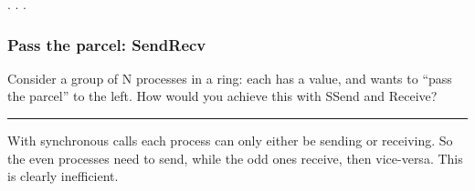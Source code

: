 . . .

\begin{Shaded}
\begin{Highlighting}[]
     
\end{Highlighting}
\end{Shaded}

\subsubsection{Pass the parcel:
SendRecv}\label{pass-the-parcel-sendrecv}

Consider a group of N processes in a ring: each has a value, and wants
to ``pass the parcel'' to the left. How would you achieve this with
SSend and Receive?

\begin{Shaded}
\begin{Highlighting}[]

     
     \NormalTok{;}

     \NormalTok{;}
     \NormalTok{;}
     \NormalTok{) \{}
      \NormalTok{;}
    \NormalTok{\}}
     \NormalTok{)\{}
      \NormalTok{;}
    \NormalTok{\}}
\end{Highlighting}
\end{Shaded}

\begin{center}\rule{3in}{0.4pt}\end{center}

With synchronous calls each process can only either be sending or
receiving. So the even processes need to send, while the odd ones
receive, then vice-versa. This is clearly inefficient.

